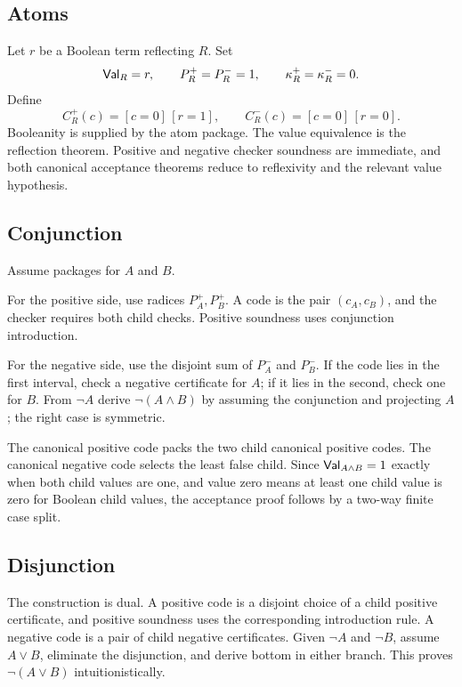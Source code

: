 \subsection{Atoms}

Let \(r\) be a Boolean term reflecting \(R\).  Set
\[
 \mathsf{Val}_R=r,
 \qquad P_R^+=P_R^-=1,
 \qquad \kappa_R^+=\kappa_R^-=0.
\]
Define
\[
 C_R^+(c)= [c=0]\,[r=1],
 \qquad
 C_R^-(c)= [c=0]\,[r=0].
\]
Booleanity is supplied by the atom package.  The value equivalence is the
reflection theorem.  Positive and negative checker soundness are immediate,
and both canonical acceptance theorems reduce to reflexivity and the relevant
value hypothesis.

\subsection{Conjunction}

Assume packages for \(A\) and \(B\).

For the positive side, use radices \(P_A^+,P_B^+\).  A code is the pair
\((c_A,c_B)\), and the checker requires both child checks.  Positive soundness
uses conjunction introduction.

For the negative side, use the disjoint sum of \(P_A^-\) and \(P_B^-\).  If the
code lies in the first interval, check a negative certificate for \(A\); if it
lies in the second, check one for \(B\).  From \(\neg A\) derive
\(\neg(A\wedge B)\) by assuming the conjunction and projecting \(A\); the
right case is symmetric.

The canonical positive code packs the two child canonical positive codes.  The
canonical negative code selects the least false child.  Since
\(\mathsf{Val}_{A\wedge B}=1\) exactly when both child values are one, and value zero
means at least one child value is zero for Boolean child values, the acceptance
proof follows by a two-way finite case split.

\subsection{Disjunction}

The construction is dual.  A positive code is a disjoint choice of a child
positive certificate, and positive soundness uses the corresponding
introduction rule.  A negative code is a pair of child negative certificates.
Given \(\neg A\) and \(\neg B\), assume \(A\vee B\), eliminate the disjunction,
and derive bottom in either branch.  This proves \(\neg(A\vee B)\)
intuitionistically.

